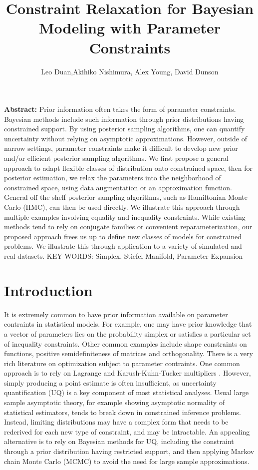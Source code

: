 \documentclass[10pt,fleqn]{article}
\title{\textbf{Constraint Relaxation for Bayesian Modeling with Parameter Constraints}}
\author{Leo Duan,Akihiko Nishimura,  Alex Young,  David Dunson}
\date{}
\DeclareMathOperator{\1}{\mathbbm{1}}
\begin{document}
\maketitle
{\bf Abstract:} Prior information often takes  the form of parameter constraints. Bayesian methods include such information through prior distributions having constrained support. By using posterior sampling algorithms, one can quantify uncertainty without relying on asymptotic approximations. However, outside of narrow settings, parameter constraints
make it difficult to develop new  prior and/or   efficient posterior sampling algorithms. We first propose a general approach to adapt flexible classes of distribution onto constrained space, 
  then  for posterior estimation, we relax the parameters  into the neighborhood of constrained
space, using data augmentation or  an  approximation function. General off the shelf posterior sampling algorithms, such as Hamiltonian Monte Carlo (HMC), can then be used directly. We illustrate this approach through multiple examples involving equality and inequality constraints. While existing methods tend to rely on conjugate families or convenient reparameterization, our proposed approach frees us up to define new classes of  models for constrained problems. We illustrate this through application to a variety of simulated and real datasets.
\vskip 12pt
{\noindent KEY WORDS: Simplex,  Stiefel Manifold, Parameter Expansion}
{}


\section{Introduction}
It is extremely common to have prior information available on parameter
contraints in statistical models. For example, one may have prior knowledge
that a vector of parameters lies on the probability simplex or satisfies a
particular set of inequality constraints. Other common examples include
shape constraints on functions, positive semidefiniteness of matrices and
orthogonality. There is a very rich literature on optimization subject to
parameter contraints. One common approach is to rely on Lagrange and
Karush-Kuhn-Tucker multipliers \citep{boyd2004convex}. However, simply
producing a point estimate is often insufficient, as uncertainty
quantification (UQ) is a key component of most statistical analyses. Usual
large sample asymptotic theory, for example showing asymptotic normality of
statistical estimators, tends to break down in constrained inference
problems. Instead, limiting distributions may have a complex form that
needs to be rederived for each new type of constraint, and may be
intractable. An appealing alternative is to rely on Bayesian methods for
UQ, including the constraint through a prior distribution having restricted
support, and then applying Markov chain Monte Carlo (MCMC) to avoid the
need for large sample approximations.
\end{document}
